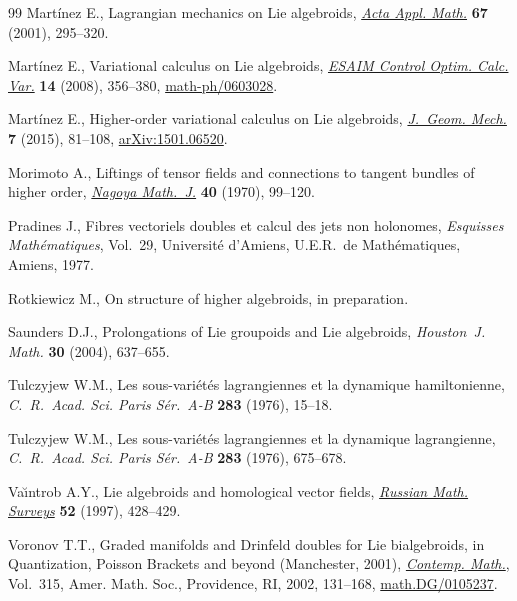 \begin{thebibliography}{99}
Mart\'{i}nez E., Lagrangian mechanics on {L}ie algebroids, \href{https://doi.org/10.1023/A:1011965919259}{\textit{Acta Appl.
 Math.}} \textbf{67} (2001), 295--320.

Mart\'{i}nez E., Variational calculus on {L}ie algebroids, \href{https://doi.org/10.1051/cocv:2007056}{\textit{ESAIM
 Control Optim. Calc. Var.}} \textbf{14} (2008), 356--380,
 \href{https://arxiv.org/abs/math-ph/0603028}{math-ph/0603028}.

Mart\'{i}nez E., Higher-order variational calculus on {L}ie algebroids,
 \href{https://doi.org/10.3934/jgm.2015.7.81}{\textit{J.~Geom. Mech.}} \textbf{7} (2015), 81--108, \href{https://arxiv.org/abs/1501.06520}{arXiv:1501.06520}.

Morimoto A., Liftings of tensor fields and connections to tangent bundles of
 higher order, \href{https://doi.org/10.1017/S002776300001388X}{\textit{Nagoya Math.~J.}} \textbf{40} (1970), 99--120.

Pradines J., Fibres vectoriels doubles et calcul des jets non holonomes,
 \textit{Esquisses Math\'{e}matiques}, Vol.~29,
 Universit\'{e} d'Amiens, U.E.R.~de Math\'{e}matiques, Amiens, 1977.

Rotkiewicz M., On structure of higher algebroids, {i}n preparation.

Saunders D.J., Prolongations of {L}ie groupoids and {L}ie algebroids,
 \textit{Houston~J. Math.} \textbf{30} (2004), 637--655.

Tulczyjew W.M., Les sous-vari\'{e}t\'{e}s lagrangiennes et la dynamique
 hamiltonienne, \textit{C.~R.~Acad. Sci. Paris S\'{e}r.~A-B} \textbf{283}
 (1976), 15--18.

Tulczyjew W.M., Les sous-vari\'{e}t\'{e}s lagrangiennes et la dynamique
 lagrangienne, \textit{C.~R.~Acad. Sci. Paris S\'{e}r.~A-B} \textbf{283}
 (1976), 675--678.

Va\u{\i}ntrob A.Y., Lie algebroids and homological vector fields,
 \href{https://doi.org/10.1070/RM1997v052n02ABEH001802}{\textit{Russian Math. Surveys}} \textbf{52} (1997), 428--429.

Voronov T.T., Graded manifolds and {D}rinfeld doubles for {L}ie bialgebroids,
 in Quantization, {P}oisson Brackets and beyond ({M}anchester, 2001),
 \href{https://doi.org/10.1090/conm/315/05478}{\textit{Contemp. Math.}}, Vol.~315, Amer. Math. Soc., Providence, RI, 2002,
 131--168, \href{https://arxiv.org/abs/math.DG/0105237}{math.DG/0105237}.


\end{thebibliography}
